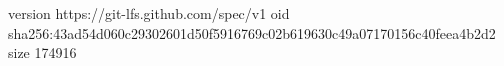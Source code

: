 version https://git-lfs.github.com/spec/v1
oid sha256:43ad54d060c29302601d50f5916769c02b619630c49a07170156c40feea4b2d2
size 174916

